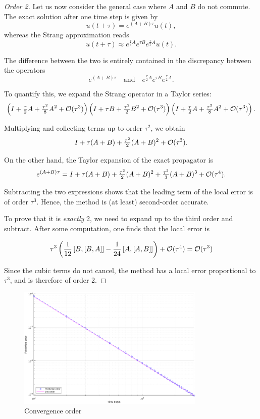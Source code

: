 \begin{proof}[Order 2]
    Let us now consider the general case where $A$ and $B$ do not commute. 
    The exact solution after one time step is given by
    \[
        u(t+\tau) = e^{(A+B)\tau} u(t),
    \]
    whereas the Strang approximation reads
    \[
        u(t+\tau) \approx e^{\frac{\tau}{2}A} e^{\tau B} e^{\frac{\tau}{2}A} u(t).
    \]

    The difference between the two is entirely contained in the discrepancy between the operators
    \[
        e^{(A+B)\tau} \quad \text{and} \quad e^{\frac{\tau}{2}A} e^{\tau B} e^{\frac{\tau}{2}A}.
    \]

    To quantify this, we expand the Strang operator in a Taylor series:
    \[
        \left( I + \tfrac{\tau}{2}A + \tfrac{\tau^2}{8}A^2 + \mathcal{O}(\tau^3) \right)
        \left( I + \tau B + \tfrac{\tau^2}{2}B^2 + \mathcal{O}(\tau^3) \right)
        \left( I + \tfrac{\tau}{2}A + \tfrac{\tau^2}{8}A^2 + \mathcal{O}(\tau^3) \right).
    \]

    Multiplying and collecting terms up to order $\tau^2$, we obtain
    \[
        I + \tau(A+B) + \tfrac{\tau^2}{2}(A+B)^2 + \mathcal{O}(\tau^3).
    \]

    On the other hand, the Taylor expansion of the exact propagator is
    \[
        e^{(A+B)\tau} = I + \tau(A+B) + \tfrac{\tau^2}{2}(A+B)^2 + \tfrac{\tau^3}{3}(A+B)^3 + \mathcal{O}(\tau^4).
    \]

    Subtracting the two expressions shows that the leading term of the local error is of order $\tau^3$. Hence, the method is (at least) second-order accurate.

    To prove that it is \emph{exactly} 2, we need to expand up to the third order and subtract. After some computation, one finds that the local error is 

    \[
        \tau^3 \left( \frac{1}{12}\left[B, \left[B, A\right]\right] - \frac{1}{24} \left[A, \left[A,B\right]\right]\right) + \mathcal{O}(\tau^4) = \mathcal{O}(\tau^3)
    \]

    Since the cubic terms do not cancel, the method has a local error proportional to $\tau^3$, and is therefore of order 2.
\end{proof}

\begin{figure}
    \centering
    \includegraphics[width=0.8\textwidth]{img/time_conv.pdf}
    \caption{Convergence order}
\end{figure}


